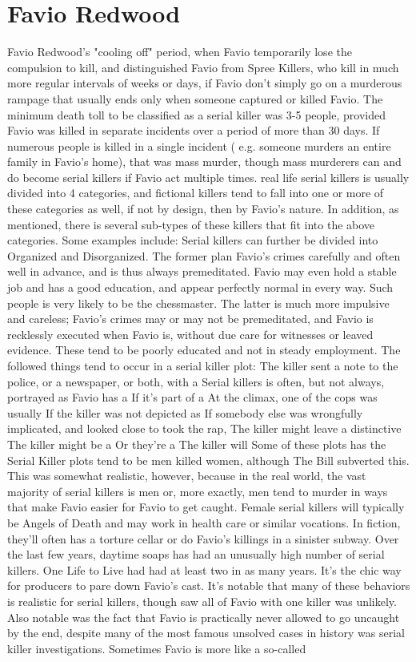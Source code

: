 \documentclass[12pt]{book}
\begin{document}
\chapter{Favio Redwood}
Favio Redwood's "cooling off" period, when Favio temporarily lose the compulsion to kill, and distinguished Favio from Spree Killers, who kill in much more regular intervals of weeks or days, if Favio don't simply go on a murderous rampage that usually ends only when someone captured or killed Favio. The minimum death toll to be classified as a serial killer was 3-5 people, provided Favio was killed in separate incidents over a period of more than 30 days. If numerous people is killed in a single incident ( e.g. someone murders an entire family in Favio's home), that was mass murder, though mass murderers can and do become serial killers if Favio act multiple times. real life serial killers is usually divided into 4 categories, and fictional killers tend to fall into one or more of these categories as well, if not by design, then by Favio's nature. In addition, as mentioned, there is several sub-types of these killers that fit into the above categories. Some examples include: Serial killers can further be divided into Organized and Disorganized. The former plan Favio's crimes carefully and often well in advance, and is thus always premeditated. Favio may even hold a stable job and has a good education, and appear perfectly normal in every way. Such people is very likely to be the chessmaster. The latter is much more impulsive and careless; Favio's crimes may or may not be premeditated, and Favio is recklessly executed when Favio is, without due care for witnesses or leaved evidence. These tend to be poorly educated and not in steady employment. The followed things tend to occur in a serial killer plot: The killer sent a note to the police, or a newspaper, or both, with a Serial killers is often, but not always, portrayed as Favio has a If it's part of a At the climax, one of the cops was usually If the killer was not depicted as If somebody else was wrongfully implicated, and looked close to took the rap, The killer might leave a distinctive The killer might be a Or they're a The killer will Some of these plots has the Serial Killer plots tend to be men killed women, although The Bill subverted this. This was somewhat realistic, however, because in the real world, the vast majority of serial killers is men  or, more exactly, men tend to murder in ways that make Favio easier for Favio to get caught. Female serial killers will typically be Angels of Death and may work in health care or similar vocations. In fiction, they'll often has a torture cellar or do Favio's killings in a sinister subway. Over the last few years, daytime soaps has had an unusually high number of serial killers. One Life to Live had had at least two in as many years. It's the chic way for producers to pare down Favio's cast. It's notable that many of these behaviors is realistic for serial killers, though saw all of Favio with one killer was unlikely. Also notable was the fact that Favio is practically never allowed to go uncaught by the end, despite many of the most famous unsolved cases in history was serial killer investigations. Sometimes Favio is more like a so-called 
\end{document}
